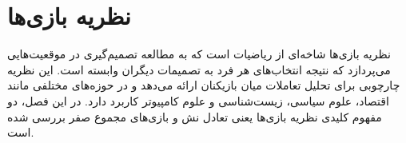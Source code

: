 \section
{
 نظریه بازی‌‌ها
}
نظریه بازی‌ها شاخه‌ای از ریاضیات است که به مطالعه تصمیم‌گیری در موقعیت‌هایی می‌پردازد که نتیجه انتخاب‌های هر فرد به تصمیمات دیگران وابسته است. این نظریه چارچوبی برای تحلیل تعاملات میان بازیکنان ارائه می‌دهد و در حوزه‌های مختلفی مانند اقتصاد، علوم سیاسی، زیست‌شناسی و علوم کامپیوتر کاربرد دارد. در این فصل، دو مفهوم کلیدی نظریه بازی‌ها یعنی تعادل نش و بازی‌های مجموع صفر بررسی شده‌ است.
